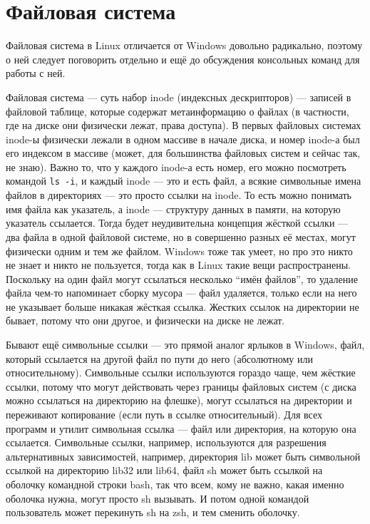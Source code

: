 \documentclass{../../text-style}
\begin{document}
\section{Файловая система}

Файловая система в Linux отличается от Windows довольно радикально, поэтому о ней следует поговорить отдельно и ещё до обсуждения консольных команд для работы с ней.

Файловая система --- суть набор inode (индексных дескрипторов) --- записей в файловой таблице, которые содержат метаинформацию о файлах (в частности, где на диске они физически лежат, права доступа).
В первых файловых системах inode-ы физически лежали в одном массиве в начале диска, и номер inode-а был его индексом в массиве (может, для большинства файловых систем и сейчас так, не знаю).
Важно то, что у каждого inode-а есть номер, его можно посмотреть командой \verb|ls -i|, и каждый inode --- это и есть файл, а всякие символьные имена файлов в директориях --- это просто ссылки на inode.
То есть можно понимать имя файла как указатель, а inode --- структуру данных в памяти, на которую указатель ссылается. 
Тогда будет неудивительна концепция жёсткой ссылки --- два файла в одной файловой системе, но в совершенно разных её местах, могут физически одним и тем же файлом.
Windows тоже так умеет, но про это никто не знает и никто не пользуется, тогда как в Linux такие вещи распространены.
Поскольку на один файл могут ссылаться несколько \enquote{имён файлов}, то удаление файла чем-то напоминает сборку мусора --- файл удаляется, только если на него не указывает больше никакая жёсткая ссылка.
Жестких ссылок на директории не бывает, потому что они другое, и физически на диске не лежат.

Бывают ещё символьные ссылки --- это прямой аналог ярлыков в Windows, файл, который ссылается на другой файл по пути до него (абсолютному или относительному).
Символьные ссылки используются гораздо чаще, чем жёсткие ссылки, потому что могут действовать через границы файловых систем (с диска можно ссылаться на директорию на флешке), могут ссылаться на директории и переживают копирование (если путь в ссылке относительный).
Для всех программ и утилит символьная ссылка --- файл или директория, на которую она ссылается.
Символьные ссылки, например, используются для разрешения альтернативных зависимостей, например, директория lib может быть символьной ссылкой на директорию lib32 или lib64, файл sh может быть ссылкой на оболочку командной строки bash, так что всем, кому не важно, какая именно оболочка нужна, могут просто sh вызывать.
И потом одной командой пользователь может перекинуть sh на zsh, и тем сменить оболочку.
\end{document}
